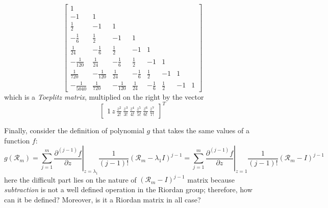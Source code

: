 \begin{displaymath}
\left[\begin{matrix}1 &   &   &   &   &   &   &  \\-1 & 1 &   &   &   &   &   &  \\\frac{1}{2} & -1 & 1 &   &   &   &   &  \\- \frac{1}{6} & \frac{1}{2} & -1 & 1 &   &   &   &  \\\frac{1}{24} & - \frac{1}{6} & \frac{1}{2} & -1 & 1 &   &   &  \\- \frac{1}{120} & \frac{1}{24} & - \frac{1}{6} & \frac{1}{2} & -1 & 1 &   &  \\\frac{1}{720} & - \frac{1}{120} & \frac{1}{24} & - \frac{1}{6} & \frac{1}{2} & -1 & 1 &  \\- \frac{1}{5040} & \frac{1}{720} & - \frac{1}{120} & \frac{1}{24} & - \frac{1}{6} & \frac{1}{2} & -1 & 1\end{matrix}\right] 
\end{displaymath}
which is a \emph{Toeplitz matrix}, multiplied on the right by the vector 
$$\left[\begin{matrix}1\,z\,\frac{z^{2}}{2!}\,\frac{z^{3}}{3!}\,\frac{z^{4}}{4!}\,\frac{z^{5}}{5!}\,\frac{z^{6}}{6!}\,\frac{z^{7}}{7!}\end{matrix}\right]^{T}$$

Finally, consider the definition of polynomial $g$ that takes the same values of a 
function $f$:
\begin{displaymath}
    g(\mathcal{R}_{m}) = \sum_{j=1}^{m}{ \left. \frac{\partial^{(j-1)}{f}}{\partial{z}} \right|_{z=\lambda_{1}}\frac{1}{(j-1)!}{(\mathcal{R}_{m}-\lambda_{1}I)^{j-1}} }
                       = \sum_{j=1}^{m}{ \left. \frac{\partial^{(j-1)}{f}}{\partial{z}} \right|_{z=1}\frac{1}{(j-1)!}{(\mathcal{R}_{m}-I)^{j-1}} }
\end{displaymath}
here the difficult part lies on the nature of $(\mathcal{R}_{m}-I)^{j-1}$
matrix because \textit{subtraction} is not a well defined operation in the
Riordan group; therefore, how can it be defined?  Moreover, is it a Riordan
matrix in all case?

